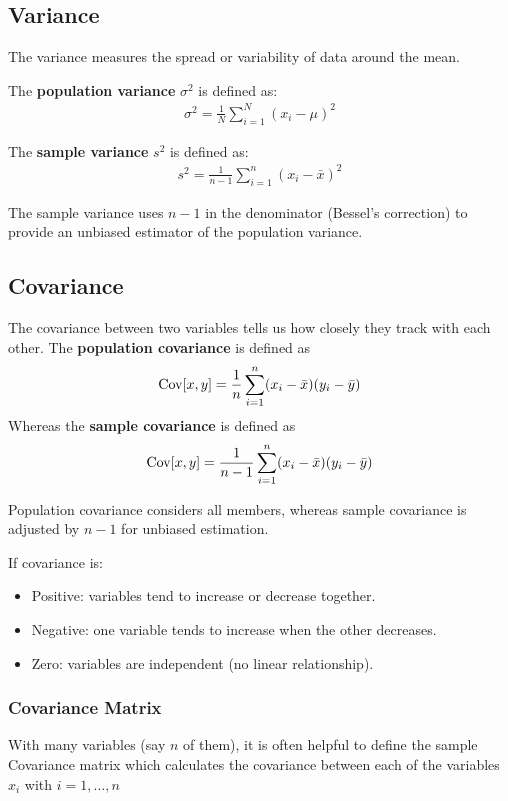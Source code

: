 \subsection{Variance}
The variance measures the spread or variability of data around the mean.

The \textbf{population variance} $\sigma^2$ is defined as:
\begin{align}
\sigma^2 = \frac{1}{N}\sum_{i=1}^N(x_i - \mu)^2
\end{align}

The \textbf{sample variance} $s^2$ is defined as:
\begin{align}
s^2 = \frac{1}{n-1}\sum_{i=1}^n(x_i - \bar{x})^2
\end{align}

The sample variance uses $n-1$ in the denominator (Bessel's correction) to provide an unbiased estimator of the population variance.

\subsection{Covariance}
The covariance between two variables tells us how closely they track with each other. The \textbf{population covariance} is defined as 
\begin{align}
\mathrm{Cov}[x,y] = \frac{1}{n}\sum_{i=1}^n (x_i-\bar{x})(y_i-\bar{y})
\end{align}
Whereas the \textbf{sample covariance} is defined as 
\begin{align}
	\mathrm{Cov}[x,y] = \frac{1}{n-1}\sum_{i=1}^n (x_i-\bar{x})(y_i-\bar{y})
\end{align}

Population covariance considers all members, whereas sample covariance is adjusted by $n-1$ for unbiased estimation.

If covariance is:
\begin{itemize}
    \item Positive: variables tend to increase or decrease together.
    \item Negative: one variable tends to increase when the other decreases.
    \item Zero: variables are independent (no linear relationship).
\end{itemize}

\subsubsection{Covariance Matrix}\label{covmat}
With many variables (say $n$ of them), it is often helpful to define the sample Covariance matrix which calculates the covariance between each of the variables $x_i$ with $i = 1,\dots, n$

